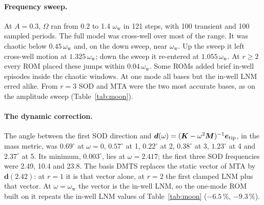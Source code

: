 \documentclass[11pt]{article}
\begin{document}
\paragraph{Frequency sweep.} At $A=0.3$, $\varOmega$ ran from 0.2 to 1.4 $\omega_{\mathrm w}$ in 121 steps, with 100 transient and 100 sampled periods. The full model was cross-well over most of the range. It was chaotic below $0.45\,\omega_{\mathrm w}$ and, on the down sweep, near $\omega_{\mathrm w}$. Up the sweep it left cross-well motion at $1.325\,\omega_{\mathrm w}$; down the sweep it re-entered at $1.055\,\omega_{\mathrm w}$. At $r\ge2$ every ROM placed these jumps within $0.04\,\omega_{\mathrm w}$. Some ROMs added brief in-well episodes inside the chaotic windows. At one mode all bases but the in-well LNM erred alike. From $r=3$ SOD and MTA were the two most accurate bases, as on the amplitude sweep (Table~\ref{tab:moon}).
\paragraph{The dynamic correction.} The angle between the first SOD direction and $\bm{d}(\omega)=(\bm{K}-\omega^2\bm{M})^{-1}\bm{e}_{\mathrm{tip}}$, in the mass metric, was $0.69^\circ$ at $\omega=0$, $0.57^\circ$ at 1, $0.22^\circ$ at 2, $0.38^\circ$ at 3, $1.23^\circ$ at 4 and $2.37^\circ$ at 5. Its minimum, $0.003^\circ$, lies at $\omega=2.417$; the first three SOD frequencies were 2.49, 10.4 and 23.8. The basis DMTS replaces the static vector of MTA by $\bm{d}(2.42)$: at $r=1$ it is that vector alone, at $r=2$ the first clamped LNM plus that vector. At $\omega=\omega_{\mathrm w}$ the vector is the in-well LNM, so the one-mode ROM built on it repeats the in-well LNM values of Table~\ref{tab:moon} ($-6.5\,\%$, $-9.3\,\%$).
\end{document}
